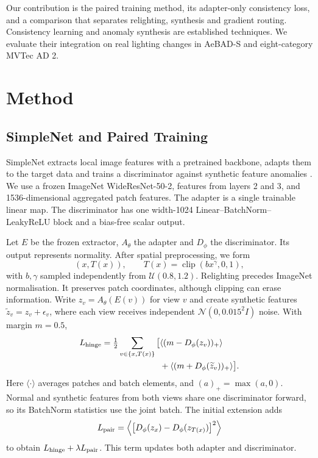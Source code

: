 \documentclass[letterpaper]{article}
\begin{document}
Our contribution is the paired training method, its adapter-only consistency loss, and a
comparison that separates relighting, synthesis and gradient routing. Consistency learning
and anomaly synthesis are established techniques. We evaluate their integration on real
lighting changes in AeBAD-S and eight-category MVTec AD 2.

\section{Method}

\subsection{SimpleNet and Paired Training}

SimpleNet extracts local image features with a pretrained backbone, adapts them to the
target data and trains a discriminator against synthetic feature anomalies
\citep{liu2023simplenet}. We use a frozen ImageNet WideResNet-50-2, features from layers 2
and 3, and 1536-dimensional aggregated patch features. The adapter is a single trainable
linear map. The discriminator has one width-1024 Linear--BatchNorm--LeakyReLU block and a
bias-free scalar output.

Let $E$ be the frozen extractor, $A_\theta$ the adapter and $D_\phi$ the discriminator. Its
output represents normality. After spatial preprocessing, we form
\begin{equation}
(x,T(x)),\qquad T(x)=\operatorname{clip}(b x^\gamma,0,1),
 \label{eq:light}
\end{equation}
with $b,\gamma$ sampled independently from $\mathcal U(0.8,1.2)$. Relighting precedes
ImageNet normalisation. It preserves patch coordinates, although clipping can erase
information. Write $z_v=A_\theta(E(v))$ for view $v$ and create synthetic features
$\widetilde z_v=z_v+\epsilon_v$, where each view receives independent $\mathcal
N(0,0.015^2I)$ noise. With margin $m=0.5$,
\begin{align}
 L_{\rm hinge}=\tfrac12\sum_{v\in\{x,T(x)\}}\big[&\langle(m-D_\phi(z_v))_+\rangle\notag\\
 &+\langle(m+D_\phi(\widetilde z_v))_+\rangle\big].
 \label{eq:hinge}
\end{align}
Here $\langle\cdot\rangle$ averages patches and batch elements, and $(a)_+=\max(a,0)$.
Normal and synthetic features from both views share one discriminator forward, so its
BatchNorm statistics use the joint batch. The initial extension adds
\begin{equation}
L_{\rm pair}=\left\langle\big[D_\phi(z_x)-D_\phi(z_{T(x)})\big]^2\right\rangle
 \label{eq:pair}
\end{equation}
to obtain $L_{\rm hinge}+\lambda L_{\rm pair}$. This term updates both adapter and
discriminator.
\end{document}
